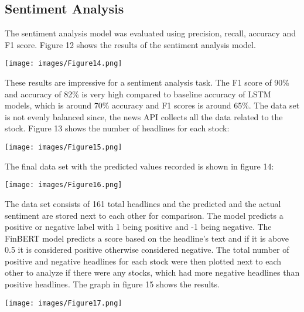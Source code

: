\documentclass[12pt,a4paper, twoside]{article}
\begin{document}
\begin{multicols}{2}
\begin{center}
\end{center}


\subsection{Sentiment Analysis}
The sentiment analysis model was evaluated using precision, recall, accuracy and F1 score. Figure 12 shows the results of the sentiment analysis model. 

    \begin{center}
        \texttt{[image: images/Figure14.png]}
    \end{center}
 

These results are impressive for a sentiment analysis task. The F1 score of 90\%  and accuracy of 82\% is very high compared to baseline accuracy of LSTM models, which is around 70\% accuracy and F1 scores is around 65\%. The data set is not evenly balanced since, the news API collects all the data related to the stock. Figure 13 shows the number of headlines for each stock:

    \begin{center}
        \texttt{[image: images/Figure15.png]}
    \end{center}
 
The final data set with the predicted values recorded is shown in figure 14:
 
    \begin{center}
        \texttt{[image: images/Figure16.png]}
    \end{center}
 
The data set consists of 161 total headlines and the predicted and the actual sentiment are stored next to each other for comparison. The model predicts a positive or negative label with 1 being positive and -1 being negative. The FinBERT model predicts a score based on the headline's text and if it is above 0.5 it is considered positive otherwise considered negative. The total number of positive and negative headlines for each stock were then plotted next to each other to analyze if there were any stocks, which had more negative headlines than positive headlines. The graph in figure 15 shows the results.
 
    \begin{center}
        \texttt{[image: images/Figure17.png]}
    \end{center} 


\end{multicols}
\end{document}
